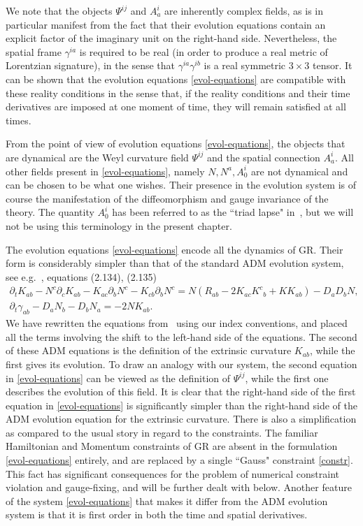 \documentclass[10pt]{report}
\theoremstyle{definition}
\begin{document}
We note that the objects $\Psi^{ij}$ and $A^i_a$ are inherently complex fields, as is in particular manifest from the fact that their evolution equations contain an explicit factor of the imaginary unit on the right-hand side. Nevertheless, the spatial frame $\gamma^{ia}$ is required to be real (in order to produce a real metric of Lorentzian signature), in the sense that $\gamma^{ia}\gamma^{ib}$ is a real symmetric $3\times 3$ tensor. It can be shown that the evolution equations \cref{evol-equations} are compatible with these reality conditions in the sense that, if the reality conditions and their time derivatives are imposed at one moment of time, they will remain satisfied at all times. 

From the point of view of evolution equations \cref{evol-equations}, the objects that are dynamical are the Weyl curvature field $\Psi^{ij}$ and the spatial connection $A^i_a$. All other fields present in \cref{evol-equations}, namely $N,N^a, A^i_0$ are not dynamical and can be chosen to be what one wishes. Their presence in the evolution system is of course the manifestation of the diffeomorphism and gauge invariance of the theory. The quantity $A_0^i$ has been referred to as the ``triad lapse" in~\cite{Asymptotically_Shinka_1999,Hyperbolic_form_Yoneda_2001}, but we will not be using this terminology in the present chapter.

The evolution equations \cref{evol-equations} encode all the dynamics of GR. Their form is considerably simpler than that of the standard ADM evolution system, see e.g.~\cite{NumericalRelatBaumga2010}, equations (2.134), (2.135)
\begin{align}
\partial_t K_{ab} - N^c \partial_c K_{ab} - K_{ac} \partial_b N^c - K_{cb} \partial_b N^c = 
N( R_{ab} - 2K_{ac}K^c{}_b + K K_{ab}) - D_a D_b N, \\ \nonumber
\partial_t \gamma_{ab} - D_a N_b - D_b N_a = - 2N K_{ab}.
\end{align}
We have rewritten the equations from~\cite{NumericalRelatBaumga2010} using our index conventions, and placed all the terms involving the shift to the left-hand side of the equations. The second of these ADM equations is the definition of the extrinsic curvature $K_{ab}$, while the first gives its evolution. To draw an analogy with our system, the second equation in \cref{evol-equations} can be viewed as the definition of $\Psi^{ij}$, while the first one describes the evolution of this field. It is clear that the right-hand side of the first equation in \cref{evol-equations} is significantly simpler than the right-hand side of the ADM evolution equation for the extrinsic curvature. There is also a simplification as compared to the usual story in regard to the constraints. The familiar Hamiltonian and Momentum constraints of GR are absent in the formulation \cref{evol-equations} entirely, and are replaced by a single ``Gauss" constraint \cref{constr}. This fact has significant consequences for the problem of numerical constraint violation and gauge-fixing, and will be further dealt with below. Another feature of the system \cref{evol-equations} that makes it differ from the ADM evolution system is that it is first order in both the time and spatial derivatives. 
\end{document}
